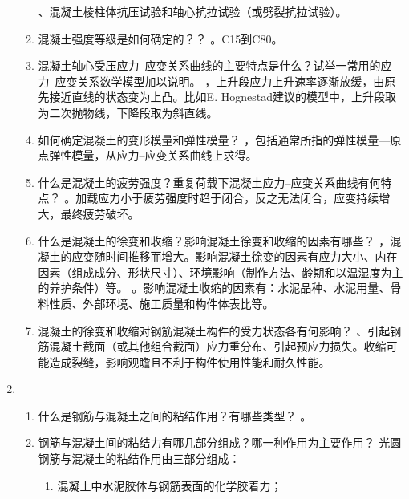\documentclass{article}
\newcommand{\gb}{《混凝土结构设计规范》（GB 50010）}
\begin{document}
\begin{enumerate}
\begin{enumerate}[1.]
                    、混凝土棱柱体抗压试验和轴心抗拉试验（或劈裂抗拉试验）。
              \item 混凝土强度等级是如何确定的？？
                    。C15到C80。
              \item 混凝土轴心受压应力--应变关系曲线的主要特点是什么？试举一常用的应力--应变关系数学模型加以说明。
                    ，上升段应力上升速率逐渐放缓，由原先接近直线的状态变为上凸。比如E. Hognestad建议的模型中，上升段取为二次抛物线，下降段取为斜直线。
              \item 如何确定混凝土的变形模量和弹性模量？
                    ，包括通常所指的弹性模量---原点弹性模量，从应力--应变关系曲线上求得。
              \item 什么是混凝土的疲劳强度？重复荷载下混凝土应力--应变关系曲线有何特点？
                    。加载应力小于疲劳强度时趋于闭合，反之无法闭合，应变持续增大，最终疲劳破坏。
              \item 什么是混凝土的徐变和收缩？影响混凝土徐变和收缩的因素有哪些？
                    ，混凝土的应变随时间推移而增大。影响混凝土徐变的因素有应力大小、内在因素（组成成分、形状尺寸）、环境影响（制作方法、龄期和以温湿度为主的养护条件）等。
                    。影响混凝土收缩的因素有：水泥品种、水泥用量、骨料性质、外部环境、施工质量和构件体表比等。
              \item 混凝土的徐变和收缩对钢筋混凝土构件的受力状态各有何影响？
                    、引起钢筋混凝土截面（或其他组合截面）应力重分布、引起预应力损失。收缩可能造成裂缝，影响观瞻且不利于构件使用性能和耐久性能。
          \end{enumerate}
    \item  \begin{enumerate}[1.]
              \item 什么是钢筋与混凝土之间的粘结作用？有哪些类型？
                    。
              \item 钢筋与混凝土间的粘结力有哪几部分组成？哪一种作用为主要作用？
                    \ans 光圆钢筋与混凝土的粘结作用由三部分组成：\begin{enumerate}
                        \item 混凝土中水泥胶体与钢筋表面的化学胶着力；

\end{enumerate}
\end{enumerate}
\end{enumerate}
\end{document}
